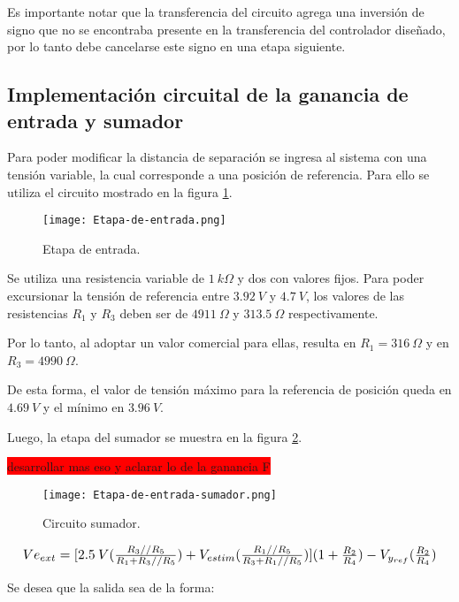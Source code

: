 Es importante notar que la transferencia del circuito agrega una inversión de signo que no se encontraba presente en la transferencia del controlador diseñado, por lo tanto debe cancelarse este signo en una etapa siguiente.


\subsection{Implementación circuital de la ganancia de entrada y sumador}


\noindent Para poder modificar la distancia de separación se ingresa al sistema con una tensión variable, la cual corresponde a una posición de referencia. Para ello se utiliza el circuito mostrado en la figura \ref{fig:etapa-de-entrada}.

\begin{figure}[H]
	\centering
	\texttt{[image: Etapa-de-entrada.png]}
	\caption{ Etapa de entrada.}
	\label{fig:etapa-de-entrada}
\end{figure}

 
Se utiliza una resistencia variable de $1\:k\Omega$ y dos con valores fijos. Para poder excursionar la tensión de referencia entre $3.92\:V$ y $4.7\:V$, los valores de las resistencias $R_1$ y $R_3$ deben ser de $4911\:\Omega$ y $313.5\:\Omega$ respectivamente. 

Por lo tanto, al adoptar un valor comercial para ellas, resulta en $R_1 = 316 \:\Omega$ y en $R_3 = 4990 \:\Omega$.

De esta forma, el valor de tensión máximo para la referencia de posición queda en $4.69\:V$ y el mínimo en $3.96\:V$.
 
Luego, la etapa del sumador se muestra en la figura \ref{fig:etapa-de-entrada-sumador}.

\colorbox{red}{desarrollar mas eso y aclarar lo de la ganancia F}

\begin{figure}[H]
	\centering
	\texttt{[image: Etapa-de-entrada-sumador.png]}
	\caption{Circuito sumador.}
	\label{fig:etapa-de-entrada-sumador}
\end{figure}


\begin{equation*}
	\resizebox{.99\hsize}{!}
	{
		$
		Ve_{ext}= [2.5\:V (\frac{R_3//R_5}{R_1+R_3//R_5})+V_{estim}(\frac{R_1//R_5}{R_3+R_1//R_5})](1+\frac{R_2}{R_4})-V_{y_{ref}}(\frac{R_2}{R_4})
		$
	}
\end{equation*}


Se desea que la salida sea de la forma:

